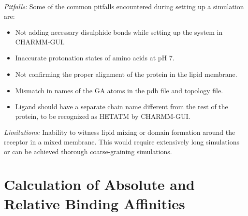 \documentclass[12pt]{article}
\begin{document}
\noindent\textit{Pitfalls:} 
Some of the common pitfalls encountered during setting up a simulation are:
		\begin{itemize}
			\item Not adding necessary disulphide bonds while setting up the system in CHARMM-GUI.
			\item Inaccurate protonation states of amino acids at pH 7.
			\item Not confirming the proper alignment of the protein in the lipid membrane.
			\item Mismatch in names of the GA atoms in the pdb file and topology file.
			\item Ligand should have a separate chain name different from the rest of the protein, to be recognized as HETATM by CHARMM-GUI.
		\end{itemize}		
	 
\noindent\textit{Limitations:} Inability to witness lipid mixing or domain formation around the receptor in a mixed membrane. This would require extensively long simulations or can be achieved thorough coarse-graining simulations.

\section{Calculation of Absolute and Relative Binding Affinities} 
\end{document}
